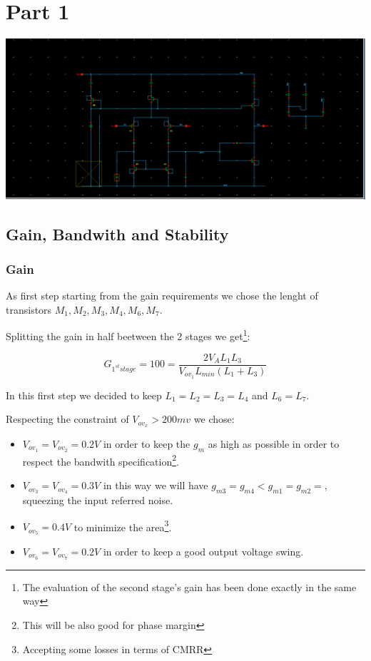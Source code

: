 \chapter{Part 1} %
\label{cha:part_1}

\centering
\includegraphics[width=1\textwidth]{Capitoli/whole.png}
\raggedright


\section{Gain, Bandwith and Stability} %
\label{sec:gain_and_bandwith}

\subsection{Gain} %
\label{subsec:gain}



As first step starting from the gain requirements we chose the lenght of transistors $M_1,M_2,M_3,M_4,M_6,M_7.$

Splitting the gain in half beetween the 2 stages we get\footnote{The evaluation of the second stage's gain has been done exactly in the same way}:

\begin{equation}
	G_{1^{st} stage} = 100 = \frac{2V_AL_1L_3}{V_{ov_1}L_{min}(L_1+L_3)}
\end{equation}


In this first step we decided to keep $L_1=L_2=L_3=L_4$ and $L_6=L_7$.

Respecting the constraint of $V_{ov_x} > 200mv$ we chose:

\begin{itemize}
	\item $V_{ov_1}=V_{ov_2}= 0.2V$ in order to keep the $g_m$ as high as possible in order to respect the bandwith specification\footnote{This will be also good for phase margin}.
	\item $V_{ov_3}=V_{ov_4}= 0.3V$ in this way we will have $g_{m3}=g_{m4}<g_{m1}=g_{m2}=$, squeezing the input referred noise.
	\item $V_{ov_5}= 0.4V$ to minimize the area\footnote{Accepting some losses in terms of CMRR}.
	\item $V_{ov_6}=V_{ov_7}= 0.2V$ in order to keep a good output voltage swing. 
\end{itemize}

